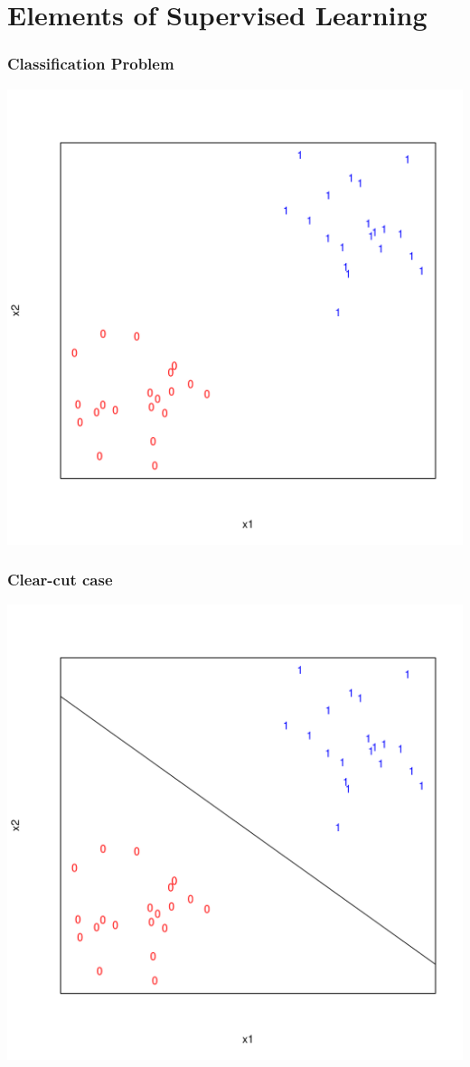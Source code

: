 \documentclass[xcolor=x11names,compress]{beamer}\usepackage[]{graphicx}\usepackage[]{color}
\newenvironment{knitrout}{}{} %
\begin{document}
\section[Classification]{Elements of Supervised Learning}





\begin{frame}
  \frametitle{Classification Problem}
\begin{knitrout}\tiny
{}\color{fgcolor}

{\centering \includegraphics[width=.6\linewidth]{figure/beamer-predmod1-1} 

}



\end{knitrout}
\end{frame}

\begin{frame}
  \frametitle{Clear-cut case}
\begin{knitrout}\tiny
{}\color{fgcolor}

{\centering \includegraphics[width=.6\linewidth]{figure/beamer-predmod2-1} 

}



\end{knitrout}
\end{frame}
\end{document}

